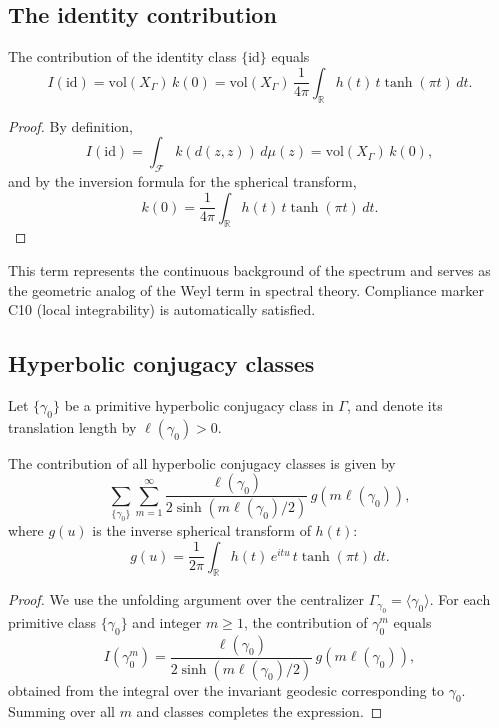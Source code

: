 \subsection{The identity contribution}
\label{subsec:ch4-part5-identity}
\relax

\begin{lemma}
\label{lem:identity-contrib}
The contribution of the identity class $\{\mathrm{id}\}$ equals
\[
I(\mathrm{id}) = \mathrm{vol}(X_\Gamma)\,k(0)
=\mathrm{vol}(X_\Gamma)\,\frac{1}{4\pi}\int_{\mathbb{R}}h(t)\,t\tanh(\pi t)\,dt.
\]
\end{lemma}

\begin{proof}\relax
By definition,
\[
I(\mathrm{id})=\int_{\mathcal{F}}k(d(z,z))\,d\mu(z)=\mathrm{vol}(X_\Gamma)\,k(0),
\]
and by the inversion formula for the spherical transform,
\[
k(0)=\frac{1}{4\pi}\int_{\mathbb{R}}h(t)\,t\tanh(\pi t)\,dt.
\]
\end{proof}

\begin{remark}
This term represents the continuous background of the spectrum and serves as the geometric analog of the Weyl term in spectral theory.  
Compliance marker C10 (local integrability) is automatically satisfied.
\end{remark}

\subsection{Hyperbolic conjugacy classes}
\label{subsec:ch4-part5-hyperbolic}
\relax

Let $\{\gamma_0\}$ be a primitive hyperbolic conjugacy class in $\Gamma$, and denote its translation length by $\ell(\gamma_0)>0$.

\begin{lemma}
\label{lem:hyperbolic-contrib}
The contribution of all hyperbolic conjugacy classes is given by
\[
\sum_{\{\gamma_0\}}\sum_{m=1}^{\infty}
\frac{\ell(\gamma_0)}{2\sinh(m\ell(\gamma_0)/2)}\,g(m\ell(\gamma_0)),
\]
where $g(u)$ is the inverse spherical transform of $h(t)$:
\[
g(u)=\frac{1}{2\pi}\int_{\mathbb{R}}h(t)\,e^{itu}\,t\tanh(\pi t)\,dt.
\]
\end{lemma}

\begin{proof}\relax
We use the unfolding argument over the centralizer $\Gamma_{\gamma_0}=\langle\gamma_0\rangle$.  
For each primitive class $\{\gamma_0\}$ and integer $m\ge1$, the contribution of $\gamma_0^m$ equals
\[
I(\gamma_0^m)=\frac{\ell(\gamma_0)}{2\sinh(m\ell(\gamma_0)/2)}\,g(m\ell(\gamma_0)),
\]
obtained from the integral over the invariant geodesic corresponding to $\gamma_0$.  
Summing over all $m$ and classes completes the expression.
\end{proof}

